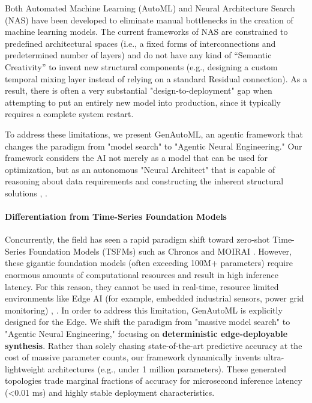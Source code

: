 \documentclass{article}
\begin{document}
Both Automated Machine Learning (AutoML) \cite{automl} and Neural Architecture Search (NAS) \cite{elsken2019neural} have been developed to eliminate manual bottlenecks in the creation of machine learning models. 
The current frameworks of NAS are constrained to predefined architectural spaces (i.e., a fixed forms of interconnections and predetermined number of layers) and do not have any kind of ``Semantic Creativity'' to invent new structural components (e.g., designing a custom temporal mixing layer instead of relying on a standard Residual connection). As a result, there is often a very substantial "design-to-deployment" gap when attempting to put an entirely new model into production, since it typically requires a complete system restart.

To address these limitations, we present GenAutoML, an agentic framework that changes the paradigm from "model search" to "Agentic Neural Engineering." Our framework considers the AI not merely as a model that can be used for optimization, but as an autonomous "Neural Architect" that is capable of reasoning about data requirements and constructing the inherent structural solutions \cite{wang2024survey}, \cite{shinn2023reflexion}.

\paragraph{Differentiation from Time-Series Foundation Models} 
Concurrently, the field has seen a rapid paradigm shift toward zero-shot Time-Series Foundation Models (TSFMs) such as Chronos \cite{ansari2024chronos} and MOIRAI \cite{woo2024unified}. However, these gigantic foundation models (often exceeding 100M+ parameters) require enormous amounts of computational resources and result in high inference latency. For this reason, they cannot be used in real-time, resource limited environments like Edge AI (for example, embedded industrial sensors, power grid monitoring) \cite{lin2020mcunet}, \cite{merenda}. In order to address this limitation, GenAutoML is explicitly designed for the Edge. We shift the paradigm from "massive model search" to "Agentic Neural Engineering," focusing on \textbf{deterministic edge-deployable synthesis}. Rather than solely chasing state-of-the-art predictive accuracy at the cost of massive parameter counts, our framework dynamically invents ultra-lightweight architectures (e.g., under 1 million parameters). These generated topologies trade marginal fractions of accuracy for microsecond inference latency (<0.01 ms) and highly stable deployment characteristics.
\end{document}
